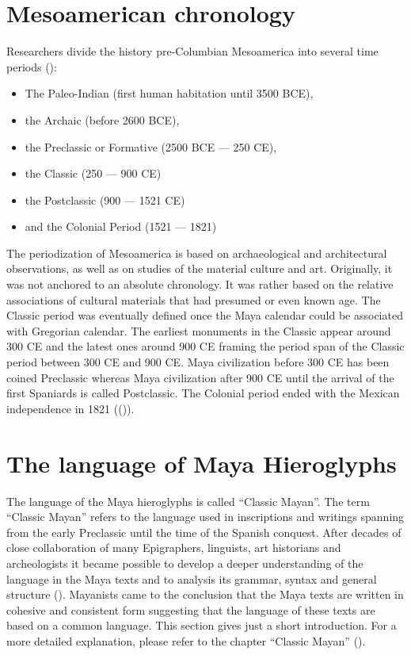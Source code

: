 \documentclass[../main.tex]{subfiles}
\begin{document}
\pagebreak
\section{Mesoamerican chronology}
Researchers divide the history pre-Columbian Mesoamerica into several time periods 
(\cite{mendoza2001}):

\begin{itemize}
    \item The Paleo-Indian (first human habitation until 3500 BCE),
    \item the Archaic (before 2600 BCE),
    \item the Preclassic or Formative (2500 BCE --- 250 CE),
    \item the Classic (250 --- 900 CE)
    \item the Postclassic (900 --- 1521 CE)
    \item and the Colonial Period (1521 --- 1821)
\end{itemize}
The periodization of Mesoamerica is based on archaeological and architectural observations,
as well as on studies of the material culture and art.
Originally, it was not anchored to an absolute chronology.
It was rather based on the relative associations of cultural materials that had presumed or 
even known age.
The Classic period was eventually defined once the Maya calendar could be associated 
with Gregorian calendar.
The earliest monuments in the Classic appear around 300 CE and the latest ones around 900 CE framing
the period span of the Classic period between 300 CE and 900 CE\@.
Maya civilization before 300 CE has been coined Preclassic whereas Maya civilization
after 900 CE until the arrival of the first Spaniards is called Postclassic.
The Colonial period ended with the Mexican independence in 1821 ((\cite{mendoza2001})).

\section{The language of Maya Hieroglyphs}
The language of the Maya hieroglyphs is called ``Classic Mayan''.
The term ``Classic Mayan'' refers to the language used in inscriptions and writings
spanning from the early Preclassic until the time of the Spanish conquest.
After decades of close collaboration of many Epigraphers, linguists, art historians and 
archeologists it became possible to develop a deeper understanding of the language in the Maya 
texts and to analysis its grammar, syntax and general structure (\cite{lawstuart2017}).
Mayanists came to the conclusion that the Maya texts are written in
cohesive and consistent form suggesting that the language of these texts are based on
a common language.
This section gives just a short introduction.
For a more detailed explanation, please refer to the chapter ``Classic Mayan'' 
().
\end{document}
